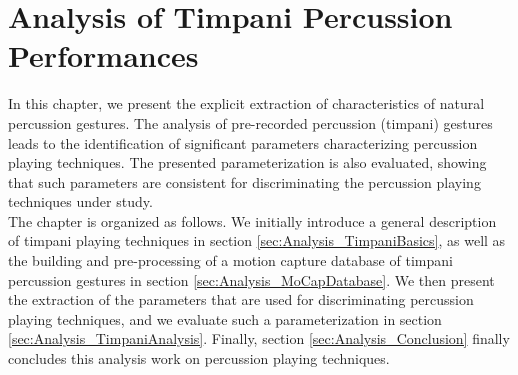 \chapter{Analysis of Timpani Percussion Performances}
\label{chapter:Analysis}




In this chapter, we present the explicit extraction of characteristics of natural percussion gestures. The analysis of pre-recorded percussion (timpani) gestures leads to the identification of significant parameters characterizing percussion playing techniques. The presented parameterization is also evaluated, showing that such parameters are consistent for discriminating the percussion playing techniques under study.\\

The chapter is organized as follows. We initially introduce a general description of timpani playing techniques in section \ref{sec:Analysis_TimpaniBasics}, as well as the building and pre-processing of a motion capture database of timpani percussion gestures in section \ref{sec:Analysis_MoCapDatabase}. We then present the extraction of the parameters that are used for discriminating percussion playing techniques, and we evaluate such a parameterization in section \ref{sec:Analysis_TimpaniAnalysis}. Finally, section \ref{sec:Analysis_Conclusion} finally concludes this analysis work on percussion playing techniques.




